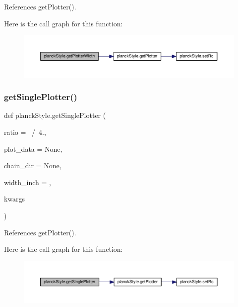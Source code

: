References get\+Plotter().

Here is the call graph for this function\+:
\nopagebreak
\begin{figure}[H]
\begin{center}
\leavevmode
\includegraphics[width=350pt]{namespaceplanckStyle_a792131eacb97cbce5b33d2120bc07307_cgraph}
\end{center}
\end{figure}
\mbox{\label{namespaceplanckStyle_aee1034b943900d8e5947f01dc644e89d}} 
\subsubsection{\texorpdfstring{get\+Single\+Plotter()}{getSinglePlotter()}}
{\footnotesize\ttfamily def planck\+Style.\+get\+Single\+Plotter (\begin{DoxyParamCaption}\item[{}]{ratio = {~/~4.},  }\item[{}]{plot\+\_\+data = {\ttfamily None},  }\item[{}]{chain\+\_\+dir = {\ttfamily None},  }\item[{}]{width\+\_\+inch = {},  }\item[{}]{kwargs }\end{DoxyParamCaption})}



References get\+Plotter().

Here is the call graph for this function\+:
\nopagebreak
\begin{figure}[H]
\begin{center}
\leavevmode
\includegraphics[width=350pt]{namespaceplanckStyle_aee1034b943900d8e5947f01dc644e89d_cgraph}
\end{center}
\end{figure}
\mbox{\label{namespaceplanckStyle_a4fa115fe32762401a5a92d2b637bb8f9}} 
